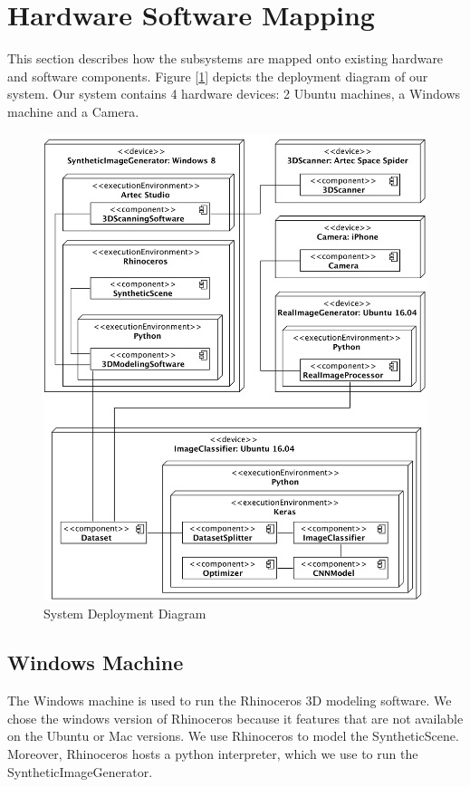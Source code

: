 \documentclass[a4paper,12pt,twoside]{report}
\begin{document}
\section{Hardware Software Mapping}
This section describes how the subsystems are mapped onto existing hardware and software components. Figure [\ref{fig:DD}] depicts the deployment diagram of our system. Our system contains 4 hardware devices: 2 Ubuntu machines, a Windows machine and a Camera.

\begin{figure}[h]
\centering
  \includegraphics[width=\textwidth]{DD}
\caption{System Deployment Diagram}
\label{fig:DD}
\end{figure}

\subsection{Windows Machine}
The Windows machine is used to run the Rhinoceros 3D modeling software. We chose the windows version of Rhinoceros because it features that are not available on the Ubuntu or Mac versions. We use Rhinoceros to model the SyntheticScene. Moreover, Rhinoceros hosts a python interpreter, which we use to run the SyntheticImageGenerator.
\end{document}
